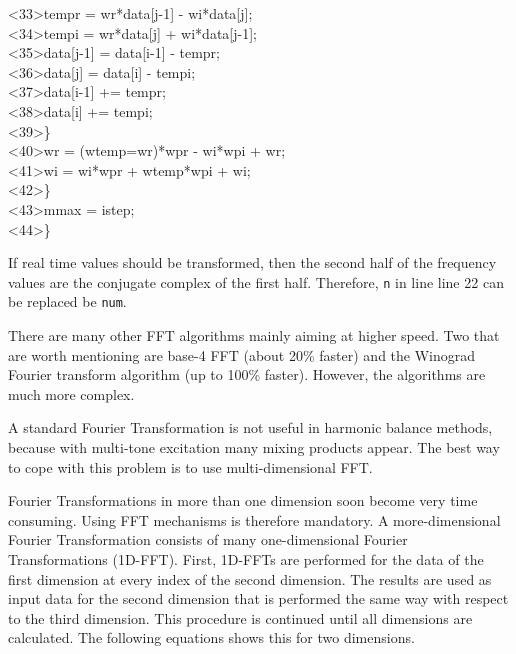 {<33>\quad \qquad\qquad\qquad tempr = wr*data[j-1] - wi*data[j]; \\
<34>\quad \qquad\qquad\qquad tempi = wr*data[j] + wi*data[j-1]; \\
<35>\quad \qquad\qquad\qquad data[j-1] = data[i-1] - tempr; \\
<36>\quad \qquad\qquad\qquad data[j] = data[i] - tempi; \\
<37>\quad \qquad\qquad\qquad data[i-1] += tempr; \\
<38>\quad \qquad\qquad\qquad data[i] += tempi; \\
<39>\quad \qquad\qquad \} \\
<40>\quad \qquad\qquad wr = (wtemp=wr)*wpr - wi*wpi + wr; \\
<41>\quad \qquad\qquad wi = wi*wpr + wtemp*wpi + wi; \\
<42>\quad \qquad \} \\
<43>\quad \qquad mmax = istep; \\
<44>\quad \}
}

\addvspace{12pt}

If real time values should be transformed, then the second half
of the frequency values are the conjugate complex of the first half.
Therefore, \texttt{n} in line line 22 can be replaced be \texttt{num}.

\addvspace{12pt}

There are many other FFT algorithms mainly aiming at higher speed.
Two that are worth mentioning are base-4 FFT (about 20\% faster)
and the Winograd Fourier transform algorithm (up to 100\% faster).
However, the algorithms are much more complex.

\addvspace{12pt}

A standard Fourier Transformation is not useful in harmonic balance
methods, because with multi-tone excitation many mixing products appear.
The best way to cope with this problem is to use multi-dimensional
FFT.

\addvspace{12pt}

Fourier Transformations in more than one dimension soon become
very time consuming. Using FFT mechanisms is therefore mandatory.
A more-dimensional Fourier Transformation consists of many
one-dimensional Fourier Transformations (1D-FFT). First, 1D-FFTs
are performed for the data of the first dimension at every index
of the second dimension. The results are used as input data for
the second dimension that is performed the same way with respect
to the third dimension. This procedure is continued until all
dimensions are calculated. The following equations shows this
for two dimensions.

